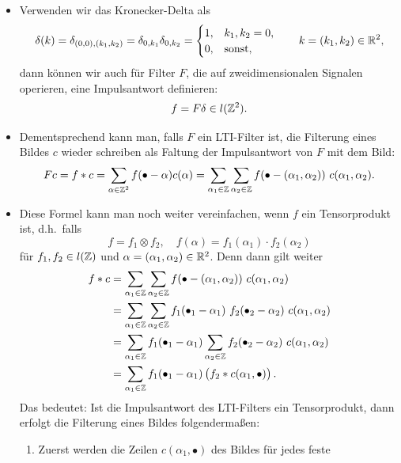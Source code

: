 \begin{remark}\leavevmode
\begin{itemize}
\item Verwenden wir das Kronecker-Delta als
  \[
      \delta(k) 
    = \delta_{(0,0), (k_{1}, k_{2})}
    = \delta_{0, k_{1}} \delta_{0, k_{2}}
    = \begin{cases}
        1, & k_{1}, k_{2} = 0, \\
        0, & \text{sonst},
      \end{cases}
     \qquad k = (k_{1}, k_{2}) \in \mathbb{R}^{2},
  \]
  dann können wir auch für Filter $ F $, die auf zweidimensionalen Signalen operieren, eine 
  Impulsantwort definieren:
  \[
    f = F\delta \in l(\mathbb{Z}^{2}).
  \]
\item Dementsprechend kann man, falls $ F $ ein LTI-Filter ist, die Filterung eines Bildes $ c $ 
  wieder schreiben als Faltung der Impulsantwort von $ F $ mit dem Bild:
  \[
      Fc 
    = f * c
    = \sum_{\alpha \in \mathbb{Z}^{2}} f(\bullet - \alpha) c(\alpha)
    = \sum_{\alpha_{1} \in \mathbb{Z}} \sum_{\alpha_{2} \in \mathbb{Z}}
        f(\bullet - (\alpha_{1}, \alpha_{2})) \ c(\alpha_{1}, \alpha_{2}).
  \]
\item Diese Formel kann man noch weiter vereinfachen, wenn $ f $ ein Tensorprodukt ist, d.h.\ falls
  \[
    f = f_{1} \otimes f_{2}, \quad f(\alpha) = f_{1}(\alpha_{1}) \cdot f_{2}(\alpha_{2})
  \]
  für $ f_{1}, f_{2} \in l(\mathbb{Z}) $ und $ \alpha = (\alpha_{1}, \alpha_{2}) \in \mathbb{R}^{2} $. Denn dann
  gilt weiter
  \begin{align*}
     f * c
  &= \sum_{\alpha_{1} \in \Z} \sum_{\alpha_{2} \in \Z}
        f(\bullet - (\alpha_{1}, \alpha_{2})) \ c(\alpha_{1}, \alpha_{2}) \\
  &= \sum_{\alpha_{1} \in \Z} \sum_{\alpha_{2} \in \Z} 
        f_{1}(\bullet_{1} - \alpha_{1}) \ f_{2}(\bullet_{2} - \alpha_{2}) \ 
        c(\alpha_{1}, \alpha_{2}) \\
  &= \sum_{\alpha_{1} \in \Z} f_{1}(\bullet_{1} - \alpha_{1})
        \sum_{\alpha_{2} \in \Z} f_{2}(\bullet_{2} - \alpha_{2}) \ c(\alpha_{1}, \alpha_{2}) \\
  &= \sum_{\alpha_{1} \in \Z} f_{1}(\bullet_{1} - \alpha_{1})
        \left( f_{2} * c(\alpha_{1}, \bullet) \right).
  \end{align*}
  Das bedeutet: Ist die Impulsantwort des LTI-Filters ein Tensorprodukt, dann erfolgt die Filterung
  eines Bildes folgendermaßen: 
  \begin{enumerate}
  \item Zuerst werden die Zeilen $ c(\alpha_{1}, \bullet) $ des Bildes für jedes feste

\end{enumerate}
\end{itemize}
\end{remark}
